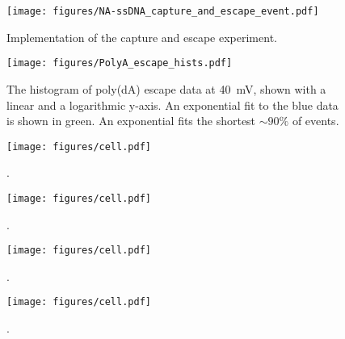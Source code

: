 \begin{figure}[h]
\begin{centering}
\texttt{[image: figures/NA-ssDNA\_capture\_and\_escape\_event.pdf]}
\caption[Capture and escape experiment schematically]{Implementation of the capture and escape experiment.}
\label{fig:capture_escape_event}
\end{centering}
\end{figure}

\begin{figure}[h]
\begin{centering}
\texttt{[image: figures/PolyA\_escape\_hists.pdf]}
\caption[Measured escape times of poly(dA) ssDNA from MspA]{The histogram of poly(dA) escape data at \SI{40}{\mV}, shown with a linear and a logarithmic y-axis.  An exponential fit to the blue data is shown in green.  An exponential fits the shortest $\sim 90\%$ of events.}
\label{fig:escape_times}
\end{centering}
\end{figure}

\begin{figure}[h]
\begin{centering}
\texttt{[image: figures/cell.pdf]}
\caption[Measured escape times of homopolymer ssDNA from MspA]{.}
\label{fig:escape_times}
\end{centering}
\end{figure}

\begin{figure}[h]
\begin{centering}
\texttt{[image: figures/cell.pdf]}
\caption[Current blockages for homopolymer ssDNA]{.}
\label{fig:homopolymer_blockages}
\end{centering}
\end{figure}

\begin{figure}[h]
\begin{centering}
\texttt{[image: figures/cell.pdf]}
\caption[Current fluctuations for poly(dC) ssDNA]{.}
\label{fig:polyC_fluctuations}
\end{centering}
\end{figure}

\begin{figure}[h]
\begin{centering}
\texttt{[image: figures/cell.pdf]}
\caption[Current fluctuations for all homopolymer ssDNA]{.}
\label{fig:homopolymer_fluctuations}
\end{centering}
\end{figure}

